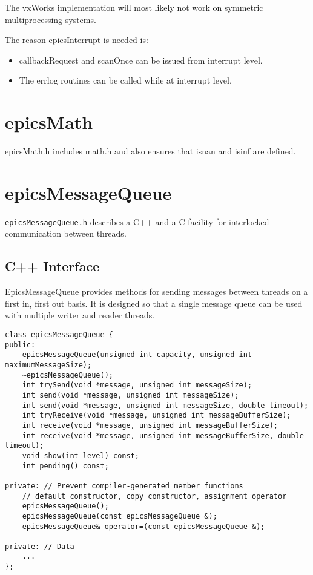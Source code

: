 The vxWorks implementation will most likely not work on symmetric multiprocessing systems.

The reason epicsInterrupt is needed is:

\begin{itemize}
\item callbackRequest and scanOnce can be issued from interrupt level.

\item The errlog routines can be called while at interrupt level.

\end{itemize}

\section{epicsMath}

epicsMath.h includes math.h and also ensures that isnan and isinf are defined.

\section{epicsMessageQueue}

\verb|epicsMessageQueue.h| describes a C++ and a C facility for interlocked communication between threads.

\subsection{C++ Interface}

EpicsMessageQueue provides methods for sending messages between threads on a first in, first out basis.
It is designed so that a single message queue can be used with multiple writer and reader threads.

\begin{verbatim}
class epicsMessageQueue {
public:
    epicsMessageQueue(unsigned int capacity, unsigned int maximumMessageSize);
    ~epicsMessageQueue();
    int trySend(void *message, unsigned int messageSize);
    int send(void *message, unsigned int messageSize);
    int send(void *message, unsigned int messageSize, double timeout);
    int tryReceive(void *message, unsigned int messageBufferSize);
    int receive(void *message, unsigned int messageBufferSize);
    int receive(void *message, unsigned int messageBufferSize, double timeout);
    void show(int level) const;
    int pending() const;

private: // Prevent compiler-generated member functions
    // default constructor, copy constructor, assignment operator
    epicsMessageQueue();
    epicsMessageQueue(const epicsMessageQueue &);
    epicsMessageQueue& operator=(const epicsMessageQueue &);

private: // Data
    ...
};
\end{verbatim}

